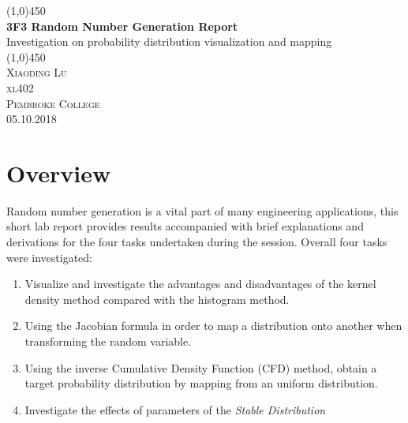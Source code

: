 \documentclass{article}
\begin{document}
\begin{titlepage}
	\begin{center}
	\line(1,0){450}\\
	[0.25in]
	\huge{\bfseries 3F3 Random Number Generation Report} \\
	[0.25in]
     \large Investigation on probability distribution visualization and mapping\\
     \line(1,0){450} \\
	[12cm]
	\textsc{\Large Xiaoding Lu \\[1cm] xl402 \\ Pembroke College \\[1.2cm] 05.10.2018}\\
	\end{center}
	\begin{flushright}

	\begin{figure}[htp]
	\begin{flushright}
	\end{flushright}
	\end{figure}
	\end{flushright}

	\vspace{2cm}

\end{titlepage}

\cleardoublepage
{}
\cleardoublepage
{}
\section{Overview}
Random number generation is a vital part of many engineering applications, this short lab report provides results accompanied with brief explanations and derivations for the four tasks undertaken during the session. Overall four tasks were investigated:
\begin{enumerate}
    \item Visualize and investigate the advantages and disadvantages of the kernel density method compared with the histogram method.
    \item Using the Jacobian formula in order to map a distribution onto another when transforming the random variable.
    \item Using the inverse Cumulative Density Function (CFD) method, obtain a target probability distribution by mapping from an uniform distribution.
    \item Investigate the effects of parameters of the \textit{Stable Distribution}
\end{enumerate}
\end{document}
